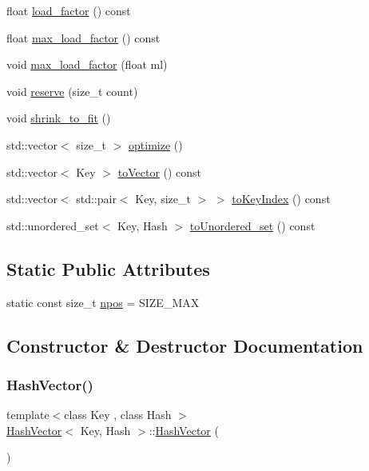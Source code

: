\begin{DoxyCompactItemize}
\item 
float \mbox{\hyperlink{class_hash_vector_a440d2b40184d79fd3e24fdb31137c3b9}{load\+\_\+factor}} () const
\item 
float \mbox{\hyperlink{class_hash_vector_a9c77cbee1053243f3019d1f013cedfc8}{max\+\_\+load\+\_\+factor}} () const
\item 
void \mbox{\hyperlink{class_hash_vector_a1bc6e963cddf7301a90dea11de9f0235}{max\+\_\+load\+\_\+factor}} (float ml)
\item 
void \mbox{\hyperlink{class_hash_vector_a7e281851a17203dd7dda859aeaa20c6a}{reserve}} (size\+\_\+t count)
\item 
void \mbox{\hyperlink{class_hash_vector_aa21f1dca09001c02ac4ed5090d137b43}{shrink\+\_\+to\+\_\+fit}} ()
\item 
std\+::vector$<$ size\+\_\+t $>$ \mbox{\hyperlink{class_hash_vector_a8384131d8bd1e720df5f09b11b3b7dda}{optimize}} ()
\item 
std\+::vector$<$ Key $>$ \mbox{\hyperlink{class_hash_vector_a37bd6de48acf712ae3936a6259c82899}{to\+Vector}} () const
\item 
std\+::vector$<$ std\+::pair$<$ Key, size\+\_\+t $>$ $>$ \mbox{\hyperlink{class_hash_vector_a35579dfa738189e4d372f85621c48733}{to\+Key\+Index}} () const
\item 
std\+::unordered\+\_\+set$<$ Key, Hash $>$ \mbox{\hyperlink{class_hash_vector_acdd566cb4429b25603131499168a0854}{to\+Unordered\+\_\+set}} () const
\end{DoxyCompactItemize}
\subsection*{Static Public Attributes}
\begin{DoxyCompactItemize}
\item 
static const size\+\_\+t \mbox{\hyperlink{class_hash_vector_abf48a0c17475981e14aaa83fec37a1e8}{npos}} = S\+I\+Z\+E\+\_\+\+M\+AX
\end{DoxyCompactItemize}


\subsection{Constructor \& Destructor Documentation}
\mbox{\label{class_hash_vector_a17eb88e2d8322b662ac5972e7ed7aa88}} 
\subsubsection{\texorpdfstring{Hash\+Vector()}{HashVector()}\hspace{0.1cm}{\footnotesize\ttfamily [1/3]}}
{\footnotesize\ttfamily template$<$class Key , class Hash $>$ \\
\mbox{\hyperlink{class_hash_vector}{Hash\+Vector}}$<$ Key, Hash $>$\+::\mbox{\hyperlink{class_hash_vector}{Hash\+Vector}} (\begin{DoxyParamCaption}{ }\end{DoxyParamCaption})\hspace{0.3cm}{\ttfamily [explicit]}}

